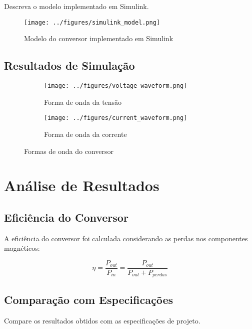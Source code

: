 \documentclass[12pt, a4paper]{article}
\begin{document}
Descreva o modelo implementado em Simulink.

\begin{figure}[H]
    \centering
    \texttt{[image: ../figures/simulink\_model.png]}
    \caption{Modelo do conversor implementado em Simulink}
    \label{fig:simulink_model}
\end{figure}

\subsection{Resultados de Simulação}

\begin{figure}[H]
    \centering
    \begin{subfigure}{0.45\textwidth}
        \texttt{[image: ../figures/voltage\_waveform.png]}
        \caption{Forma de onda da tensão}
        \label{fig:voltage}
    \end{subfigure}
    \hfill
    \begin{subfigure}{0.45\textwidth}
        \texttt{[image: ../figures/current\_waveform.png]}
        \caption{Forma de onda da corrente}
        \label{fig:current}
    \end{subfigure}
    \caption{Formas de onda do conversor}
    \label{fig:waveforms}
\end{figure}

\section{Análise de Resultados}

\subsection{Eficiência do Conversor}

A eficiência do conversor foi calculada considerando as perdas nos componentes magnéticos:

\begin{equation}
    \eta = \frac{P_{out}}{P_{in}} = \frac{P_{out}}{P_{out} + P_{perdas}}
\end{equation}

\subsection{Comparação com Especificações}

Compare os resultados obtidos com as especificações de projeto.
\end{document}
